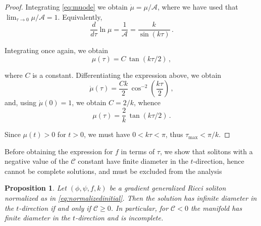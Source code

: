 \documentclass[12pt,a4paper,reqno]{amsart}
\theoremstyle{plain}
\newtheorem{proposition}[theorem]{Proposition}
\theoremstyle{remark}
\numberwithin{equation}{section}
\newcommand{\cA}{\mathcal{A}}
\newcommand{\cC}{\mathcal{C}}
\begin{document}
\begin{proof}
Integrating \eqref{eq:muode} we obtain $\dot{\mu} = \mu/\cA$, where we have used that $\lim_{\tau\to0}\mu/\cA=1$. Equivalently,
\begin{equation*}
\frac{d}{d\tau} \ln \mu = \frac{1}{\cA} = \frac{k}{\sin(k\tau)} \,.
\end{equation*}

Integrating once again, we obtain
\begin{equation*}
\mu(\tau) = C \,\tan(k\tau/2) \,,
\end{equation*}

where $C$ is a constant. Differentiating the expression above, we obtain
\begin{equation*}
\dot{\mu}(\tau) = \frac{Ck}{2}\,\cos^{-2}\left(\frac{k\tau}{2}\right) \,,
\end{equation*}
and, using $\dot{\mu}(0)=1$, we obtain $C=2/k$, whence
\begin{equation*}
\mu(\tau) = \frac{2}{k}\,\tan(k\tau/2) \,.
\end{equation*}

Since $\mu(t)>0$ for $t>0$, we must have $0<k\tau<\pi$, thus $\tau_{\max}<\pi/k$.
\end{proof}

Before obtaining the expression for $f$ in terms of $\tau$, we show that solitons with a negative value of the $\cC$ constant have finite diameter in the $t$-direction, hence cannot be complete solutions, and must be excluded from the analysis

\begin{proposition}\label{prop:dilatonconstant}
Let $(\phi,\psi,f,k)$ be a gradient generalized Ricci soliton normalized as in \eqref{eq:normalizedinitial}. Then the solution has infinite diameter in the $t$-direction if and only if $\cC \ge 0$. In particular, for $\cC < 0$ the manifold has finite diameter in the $t$-direction and is incomplete.
\end{proposition}
\end{document}
